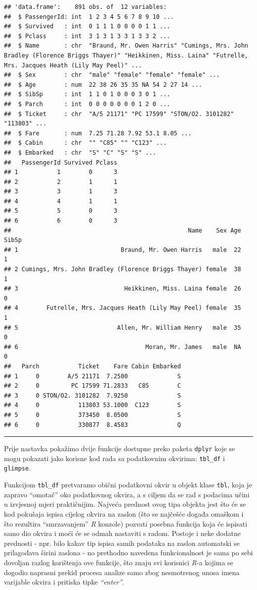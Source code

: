 \documentclass[]{book}
\theoremstyle{definition}
\theoremstyle{definition}
\theoremstyle{definition}
\theoremstyle{remark}
\begin{document}
\begin{verbatim}
## 'data.frame':    891 obs. of  12 variables:
##  $ PassengerId: int  1 2 3 4 5 6 7 8 9 10 ...
##  $ Survived   : int  0 1 1 1 0 0 0 0 1 1 ...
##  $ Pclass     : int  3 1 3 1 3 3 1 3 3 2 ...
##  $ Name       : chr  "Braund, Mr. Owen Harris" "Cumings, Mrs. John Bradley (Florence Briggs Thayer)" "Heikkinen, Miss. Laina" "Futrelle, Mrs. Jacques Heath (Lily May Peel)" ...
##  $ Sex        : chr  "male" "female" "female" "female" ...
##  $ Age        : num  22 38 26 35 35 NA 54 2 27 14 ...
##  $ SibSp      : int  1 1 0 1 0 0 0 3 0 1 ...
##  $ Parch      : int  0 0 0 0 0 0 0 1 2 0 ...
##  $ Ticket     : chr  "A/5 21171" "PC 17599" "STON/O2. 3101282" "113803" ...
##  $ Fare       : num  7.25 71.28 7.92 53.1 8.05 ...
##  $ Cabin      : chr  "" "C85" "" "C123" ...
##  $ Embarked   : chr  "S" "C" "S" "S" ...
##   PassengerId Survived Pclass
## 1           1        0      3
## 2           2        1      1
## 3           3        1      3
## 4           4        1      1
## 5           5        0      3
## 6           6        0      3
##                                                  Name    Sex Age SibSp
## 1                             Braund, Mr. Owen Harris   male  22     1
## 2 Cumings, Mrs. John Bradley (Florence Briggs Thayer) female  38     1
## 3                              Heikkinen, Miss. Laina female  26     0
## 4        Futrelle, Mrs. Jacques Heath (Lily May Peel) female  35     1
## 5                            Allen, Mr. William Henry   male  35     0
## 6                                    Moran, Mr. James   male  NA     0
##   Parch           Ticket    Fare Cabin Embarked
## 1     0        A/5 21171  7.2500              S
## 2     0         PC 17599 71.2833   C85        C
## 3     0 STON/O2. 3101282  7.9250              S
## 4     0           113803 53.1000  C123        S
## 5     0           373450  8.0500              S
## 6     0           330877  8.4583              Q
\end{verbatim}

\begin{center}\rule{0.5\linewidth}{\linethickness}\end{center}

Prije nastavka pokažimo dvije funkcije dostupne preko paketa
\texttt{dplyr} koje se mogu pokazati jako korisne kod rada sa
podatkovnim okvirima: \texttt{tbl\_df} i \texttt{glimpse}.

Funkcijom \texttt{tbl\_df} pretvaramo obični podatkovni okvir u objekt
klase \texttt{tbl}, koja je zapravo ``omotač'' oko podatkovnog okvira, a
s ciljem da se rad s podacima učini u izvjesnoj mjeri praktičnijim.
Najveća prednost ovog tipa objekta jest što će se kod pokušaja ispisa
cijelog okvira na zaslon (što se najčešće događa omaškom i što rezultira
``smrzavanjem'' \emph{R} konzole) pozvati posebna funkcija koja će
ispisati samo dio okvira i moći će se odmah nastaviti s radom. Postoje i
neke dodatne prednosti - npr. bilo kakav tip ispisa samih podataka na
zaslon automatski se prilagođava širini zaslona - no prethodno navedena
funkcionalnost je sama po sebi dovoljan razlog korištenja ove funkcije,
što znaju svi korisnici \emph{R}-a kojima se dogodio naprasni prekid
procesa analize samo zbog nesmotrenog unosa imena varijable okvira i
pritiska tipke \emph{``enter''}.
\end{document}
